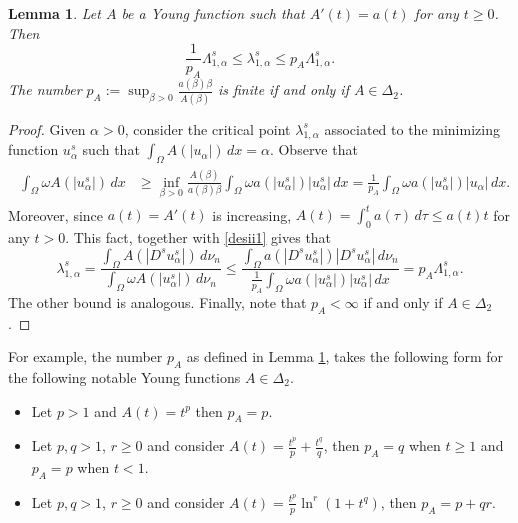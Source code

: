 \documentclass[12pt,reqno]{amsart}
\newtheorem{lem}[thm]{Lemma}
\theoremstyle{definition}
\theoremstyle{remark}
\numberwithin{equation}{section}
\begin{document}
 
\begin{lem} \label{lema.comp}
Let $A$ be a Young function such that $A'(t)=a(t)$ for any $t\geq 0$. Then
$$
\frac{1}{p_A}\Lambda_{1,\alpha}^s\leq \lambda_{1,\alpha}^s \leq   p_A \Lambda_{1,\alpha}^s.
$$
The number $p_A:=\sup_{\beta>0} \frac{a(\beta)\beta}{A(\beta)}$ is finite if and only if $A\in \Delta_2$.
\end{lem}
\begin{proof}
Given $\alpha>0$, consider the critical point  $\lambda_{1,\alpha}^s$ associated to the minimizing function $u_\alpha^s$ such that $\int_\Omega A(|u_\alpha|) \,dx =\alpha$. Observe that
\begin{align} \label{desii1}
\begin{split}
\int_\Omega \omega A(|u_\alpha^s|)\,dx &\geq \inf_{\beta>0} \frac{A(\beta)}{a(\beta)\beta}\int_\Omega \omega a(|u_\alpha^s|)|u_\alpha^s|\,dx 
=
\frac{1}{p_A}\int_\Omega \omega a(|u_\alpha^s|)|u_\alpha|\,dx.
\end{split}
\end{align}
Moreover, since $a(t)=A'(t)$ is increasing,  $A(t)=\int_0^t a(\tau)\,d\tau \leq a(t)t$ for any $t>0$. This fact, together with \eqref{desii1} gives that
$$
\lambda_{1,\alpha}^s = \frac{\int_\Omega A(|D^s u_\alpha^s|)\,d\nu_n}{\int_\Omega \omega A(|u_\alpha^s|)\,d\nu_n} \leq \frac{\int_\Omega a(|D^s u_\alpha^s|) |D^s u_\alpha^s|\,d\nu_n}{\frac{1}{p_A}\int_\Omega \omega a(|u_\alpha^s|) |u_\alpha^s|\,dx} = p_A \Lambda_{1,\alpha}^s.
$$
The other bound is analogous. Finally, note that $p_A<\infty$ if and only if $A\in \Delta_2$.
\end{proof}

For example,  the number $p_A$ as defined in Lemma \ref{lema.comp}, takes the following form for the following notable Young functions $A\in \Delta_2$.

\begin{itemize}
\item[i)] Let $p>1$ and $A(t)=t^p$ then $p_A=p$.
 
\item[ii)] Let $p,q>1$, $r\geq 0$ and consider $A(t)=\frac{t^p}{p}+ \frac{t^q}{q}$, then $p_A=q$ when $t\geq 1$ and $p_A=p$ when $t<1$.

\item[iii)] Let $p,q>1$, $r\geq 0$ and consider $A(t)=\frac{t^p}{p} \ln^r(1+t^q)$, then $p_A=p+qr$.
 \end{itemize}
\end{document}
